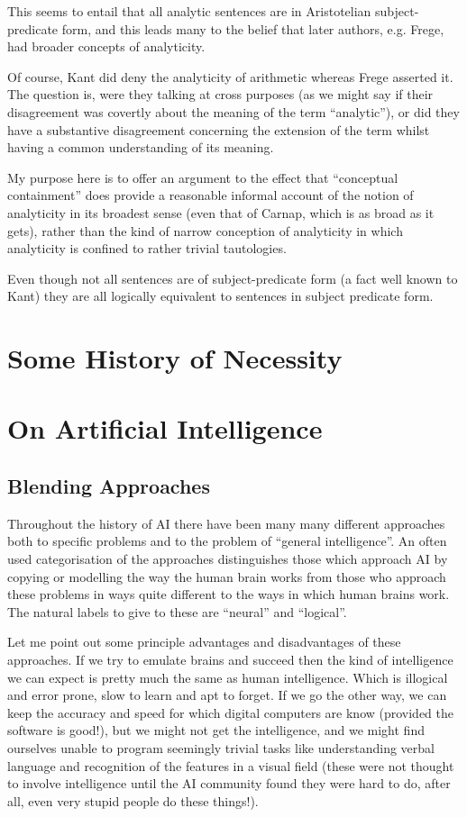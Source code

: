 \documentclass[10pt,titlepage]{article}
\begin{document}
This seems to entail that all analytic sentences are in Aristotelian subject-predicate form, and this leads many to the belief that later authors, e.g. Frege, had broader concepts of analyticity.

Of course, Kant did deny the analyticity of arithmetic whereas Frege asserted it.
The question is, were they talking at cross purposes (as we might say if their
disagreement was covertly about the meaning of the term ``analytic''), or did they
have a substantive disagreement concerning the extension of the term whilst having
a common understanding of its meaning.

My purpose here is to offer an argument to the effect that ``conceptual containment'' does
provide a reasonable informal account of the notion of analyticity in its broadest sense
(even that of Carnap, which is as broad as it gets), rather than the kind of narrow
conception of analyticity in which analyticity is confined to rather trivial tautologies.

Even though not all sentences are of subject-predicate form (a fact well known to Kant)
they are all logically equivalent to sentences in subject predicate form.


\section{Some History of Necessity}

\section{On Artificial Intelligence}

\subsection{Blending Approaches}

Throughout the history of AI there have been many many different approaches
both to specific problems and to the problem of ``general intelligence''.
An often used categorisation of the approaches distinguishes those which
approach AI by copying or modelling the way the human brain works from
those who approach these problems in ways quite different to the ways in
which human brains work.
The natural labels to give to these are ``neural'' and ``logical''.

Let me point out some principle advantages and disadvantages of these approaches.
If we try to emulate brains and succeed then the kind of intelligence we can expect
is pretty much the same as human intelligence.
Which is illogical and error prone, slow to learn and apt to forget.
If we go the other way, we can keep the accuracy and speed for which digital computers
are know (provided the software is good!), but we might not get the intelligence,
and we might find ourselves unable to program seemingly trivial tasks like
understanding verbal language and recognition of the features in a visual field
(these were not thought to involve intelligence until the AI community found they
were hard to do, after all, even very stupid people do these things!).
\end{document}
